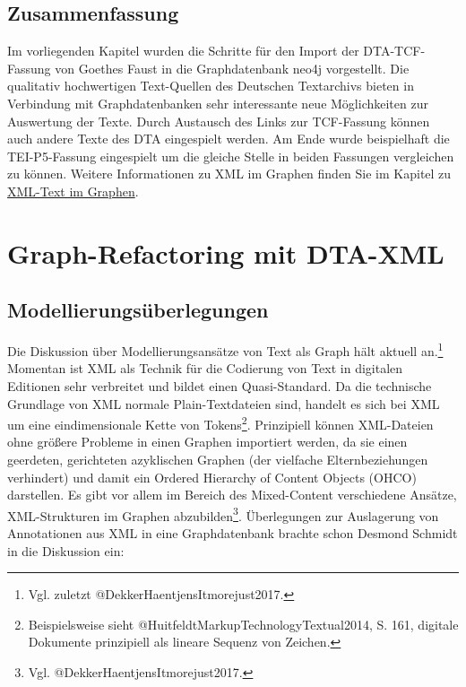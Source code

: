 \hypertarget{zusammenfassung-5}{%
\subsection{Zusammenfassung}\label{zusammenfassung-5}}

Im vorliegenden Kapitel wurden die Schritte für den Import der
DTA-TCF-Fassung von Goethes Faust in die Graphdatenbank neo4j
vorgestellt. Die qualitativ hochwertigen Text-Quellen des Deutschen
Textarchivs bieten in Verbindung mit Graphdatenbanken sehr interessante
neue Möglichkeiten zur Auswertung der Texte. Durch Austausch des Links
zur TCF-Fassung können auch andere Texte des DTA eingespielt werden. Am
Ende wurde beispielhaft die TEI-P5-Fassung eingespielt um die gleiche
Stelle in beiden Fassungen vergleichen zu können. Weitere Informationen
zu XML im Graphen finden Sie im Kapitel zu
\href{https://kuczera.github.io/Graphentechnologien/60_XML-Text-im-Graphen.html}{XML-Text
im Graphen}.

\hypertarget{graph-refactoring-mit-dta-xml}{%
\section{Graph-Refactoring mit
DTA-XML}\label{graph-refactoring-mit-dta-xml}}

\hypertarget{modellierungsuxfcberlegungen}{%
\subsection{Modellierungsüberlegungen}\label{modellierungsuxfcberlegungen}}

Die Diskussion über Modellierungsansätze von Text als Graph hält aktuell
an.\footnote{Vgl. zuletzt @DekkerHaentjensItmorejust2017.} Momentan ist
XML als Technik für die Codierung von Text in digitalen Editionen sehr
verbreitet und bildet einen Quasi-Standard. Da die technische Grundlage
von XML normale Plain-Textdateien sind, handelt es sich bei XML um eine
eindimensionale Kette von Tokens\footnote{Beispielsweise sieht
  @HuitfeldtMarkupTechnologyTextual2014, S. 161, digitale Dokumente
  prinzipiell als lineare Sequenz von Zeichen.}. Prinzipiell können
XML-Dateien ohne größere Probleme in einen Graphen importiert werden, da
sie einen geerdeten, gerichteten azyklischen Graphen (der vielfache
Elternbeziehungen verhindert) und damit ein Ordered Hierarchy of Content
Objects (OHCO) darstellen. Es gibt vor allem im Bereich des
Mixed-Content verschiedene Ansätze, XML-Strukturen im Graphen
abzubilden\footnote{Vgl. @DekkerHaentjensItmorejust2017.}. Überlegungen
zur Auslagerung von Annotationen aus XML in eine Graphdatenbank brachte
schon Desmond Schmidt in die Diskussion ein:

